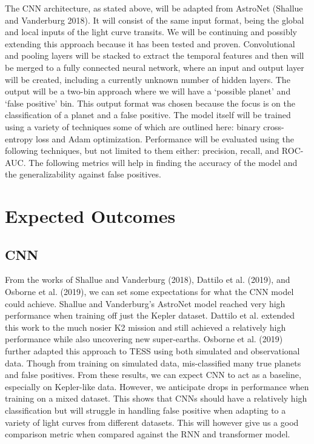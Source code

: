 \documentclass[letterpaper]{article}
\begin{document}
The CNN architecture, as stated above, will be adapted from AstroNet (Shallue and Vanderburg 2018). It will consist of the same input format, being the global and local inputs of the light curve transits. We will be continuing and possibly extending this approach because it has been tested and proven. Convolutional and pooling layers will be stacked to extract the temporal features and then will be merged to a fully connected neural network, where an input and output layer will be created, including a currently unknown number of hidden layers. The output will be a two-bin approach where we will have a `possible planet' and `false positive' bin. This output format was chosen because the focus is on the classification of a planet and a false positive. The model itself will be trained using a variety of techniques some of which are outlined here: binary cross-entropy loss and Adam optimization. Performance will be evaluated using the following techniques, but not limited to them either: precision, recall, and ROC-AUC. The following metrics will help in finding the accuracy of the model and the generalizability against false positives.

\section*{Expected Outcomes}

\subsection*{CNN}
From the works of Shallue and Vanderburg (2018), Dattilo et al. (2019), and Osborne et al. (2019), we can set some expectations for what the CNN model could achieve. Shallue and Vanderburg’s AstroNet model reached very high performance when training off just the Kepler dataset. Dattilo et al. extended this work to the much nosier K2 mission and still achieved a relatively high performance while also uncovering new super-earths. Osborne et al. (2019) further adapted this approach to TESS using both simulated and observational data. Though from training on simulated data, mis-classified many true planets and false positives. From these results, we can expect CNN to act as a baseline, especially on Kepler-like data. However, we anticipate drops in performance when training on a mixed dataset. This shows that CNNs should have a relatively high classification but will struggle in handling false positive when adapting to a variety of light curves from different datasets. This will however give us a good comparison metric when compared against the RNN and transformer model.
\end{document}

